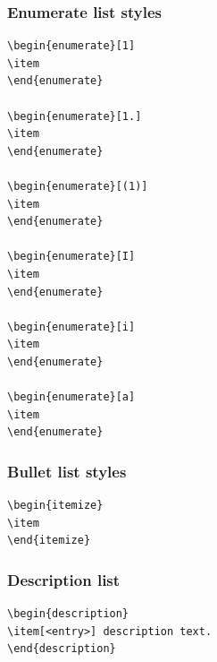 \documentclass[ACS,STIX1COL]{WileyNJD-v2}
\begin{document}
\subsubsection{Enumerate list styles}
\begin{verbatim}
\begin{enumerate}[1]
\item 
\end{enumerate}

\begin{enumerate}[1.]
\item 
\end{enumerate}

\begin{enumerate}[(1)]
\item 
\end{enumerate}

\begin{enumerate}[I]
\item 
\end{enumerate}

\begin{enumerate}[i]
\item 
\end{enumerate}

\begin{enumerate}[a]
\item 
\end{enumerate}

\end{verbatim}

\subsubsection{Bullet list styles}

\begin{verbatim}
\begin{itemize}
\item 
\end{itemize}
\end{verbatim}

\subsubsection{Description list}

\begin{verbatim}
\begin{description}
\item[<entry>] description text.
\end{description}
\end{verbatim}
\end{document}
